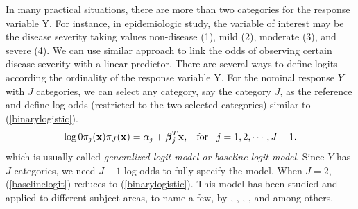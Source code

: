 \documentclass[11pt]{article}
\theoremstyle{plain}
\theoremstyle{definition}
\theoremstyle{remark}
\theoremstyle{definition}
\begin{document}
In many practical situations, there are more than two categories for the response variable Y. For instance, in epidemiologic study, the variable of interest may be the disease severity taking values non-disease (1), mild (2),
moderate (3), and severe (4). We can use similar approach to link the odds of observing certain disease
severity with a linear predictor. There are several ways to define logits according the ordinality of the response
variable Y. For the nominal response $Y$ with $J$ categories,  we can select any category, say the category $J$, as the reference and define log odds (restricted to the two selected categories) similar to (\ref{binarylogistic}).
\begin{equation}
\log \frac{\pi_j(\mathbf{x})}{\pi_J(\mathbf{x})}=\alpha_j +  {\mbox{\boldmath $\beta$}}_j^{T}\mathbf{x}, \hspace{3mm}\mbox{for}\hspace{3mm} j =1, 2, \cdots, J-1. \label{baselinelogit}
\end{equation}
which is usually called {\em generalized logit model or baseline logit model}.  Since $Y$ has $J$ categories, we need $J-1$ log odds to fully specify the model. When $J=2$, (\ref{baselinelogit}) reduces to (\ref{binarylogistic}). This model has been studied and applied to different subject areas, to name a few, by \cite{MCCULLAGH-OrdinalReg-Discussion-1980}, \cite{Anderson-JRSSS-1984}, \cite{Begg-Gray-Biometrika-1984}, \cite{Fienberg-book-1978}, and among others.
\end{document}

